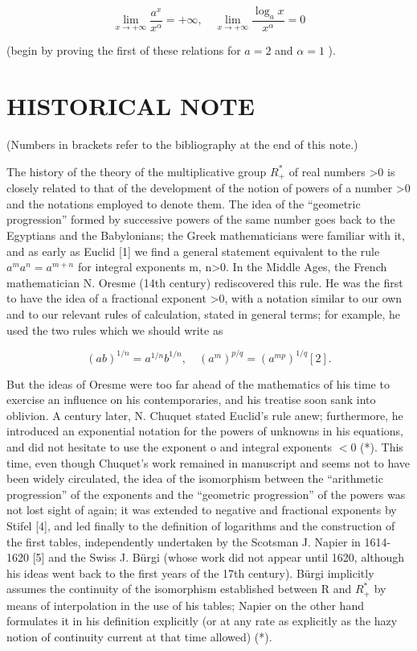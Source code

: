 \[
\lim _ {x \rightarrow + \infty} \frac {a ^ {x}}{x ^ {\alpha}} = + \infty , \quad \lim _ {x \rightarrow + \infty} \frac {\log_ {a} x}{x ^ {\alpha}} = 0
\]

(begin by proving the first of these relations for \(a = 2\) and \(\alpha = 1\) ).

\section*{HISTORICAL NOTE}
{}

(Numbers in brackets refer to the bibliography at the end of this note.)

The history of the theory of the multiplicative group \(R_{+}^{*}\) of real numbers \textgreater0 is closely related to that of the development of the notion of powers of a number \textgreater0 and the notations employed to denote them. The idea of the ``geometric progression'' formed by successive powers of the same number goes back to the Egyptians and the Babylonians; the Greek mathematicians were familiar with it, and as early as Euclid {[}1{]} we find a general statement equivalent to the rule \(a^{m}a^{n}=a^{m+n}\) for integral exponents m, n\textgreater0. In the Middle Ages, the French mathematician N. Oresme (14th century) rediscovered this rule. He was the first to have the idea of a fractional exponent \textgreater0, with a notation similar to our own and to our relevant rules of calculation, stated in general terms; for example, he used the two rules which we should write as

\[
(a b) ^ {1 / n} = a ^ {1 / n} b ^ {1 / n}, \quad (a ^ {m}) ^ {p / q} = (a ^ {m p}) ^ {1 / q} [ 2 ].
\]

But the ideas of Oresme were too far ahead of the mathematics of his time to exercise an influence on his contemporaries, and his treatise soon sank into oblivion. A century later, N. Chuquet stated Euclid's rule anew; furthermore, he introduced an exponential notation for the powers of unknowns in his equations, and did not hesitate to use the exponent o and integral exponents \(< 0\) (*). This time, even though Chuquet's work remained in manuscript and seems not to have been widely circulated, the idea of the isomorphism between the ``arithmetic progression'' of the exponents and the ``geometric progression'' of the powers was not lost sight of again; it was extended to negative and fractional exponents by Stifel {[}4{]}, and led finally to the definition of logarithms and the construction of the first tables, independently undertaken by the Scotsman J. Napier in 1614-1620 {[}5{]} and the Swiss J. Bürgi (whose work did not appear until 1620, although his ideas went back to the first years of the 17th century). Bürgi implicitly assumes the continuity of the isomorphism established between R and \(R^{*}_{+}\) by means of interpolation in the use of his tables; Napier on the other hand formulates it in his definition explicitly (or at any rate as explicitly as the hazy notion of continuity current at that time allowed) (*).

